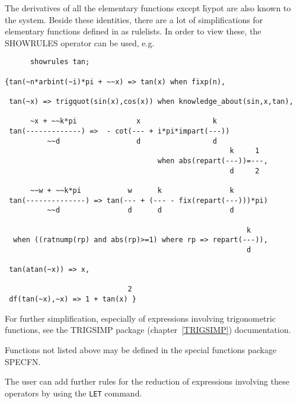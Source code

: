 The derivatives of all the elementary functions except \f{hypot} are
also known to the system.  Beside these identities, there are a lot of
simplifications for elementary functions defined in {\REDUCE} as
rulelists.  In order to view these, the SHOWRULES operator can be
used, e.g.
\begin{verbatim}
      showrules tan;

{tan(~n*arbint(~i)*pi + ~~x) => tan(x) when fixp(n),

 tan(~x) => trigquot(sin(x),cos(x)) when knowledge_about(sin,x,tan),

      ~x + ~~k*pi              x                 k
 tan(-------------) =>  - cot(--- + i*pi*impart(---))
          ~~d                  d                 d
                                                     k     1
                                    when abs(repart(---))=---,
                                                     d     2

      ~~w + ~~k*pi           w      k                k
 tan(--------------) => tan(--- + (--- - fix(repart(---)))*pi)
          ~~d                d      d                d

                                                         k
  when ((ratnump(rp) and abs(rp)>=1) where rp => repart(---)),
                                                         d

 tan(atan(~x)) => x,

                             2
 df(tan(~x),~x) => 1 + tan(x) }
\end{verbatim}

For further simplification, especially of expressions involving
trigonometric functions, see the TRIGSIMP package
(chapter~\ref{TRIGSIMP}) documentation.

Functions not listed above may be defined in the special functions
package SPECFN.

The user can add further rules for the reduction of expressions involving
these operators by using the \texttt{LET} command.

